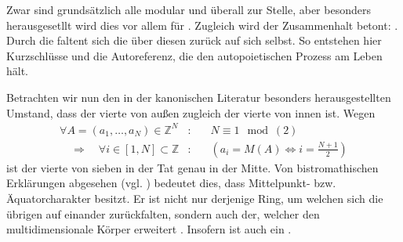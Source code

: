 \begin{newstuff}
    Zwar sind grundsätzlich alle  modular und überall zur Stelle, aber besonders herausgesetllt wird dies vor allem für . Zugleich wird der Zusammenhalt betont: .
    Durch die  faltent sich die  über diesen  zurück auf sich selbst. So entstehen hier Kurzschlüsse und die Autoreferenz, die den autopoietischen Prozess am Leben hält. 

    Betrachten wir nun den in der kanonischen Literatur besonders herausgestellten Umstand, dass der vierte  von außen zugleich der vierte von innen ist. Wegen
        \begin{equation}
        \begin{array}{rcl}
            \forall A = (a_1,\ldots,a_N) \in \mathbb{Z}^N&:&
            \quad
            N\equiv 1\mod(2)\\
            \quad\Rightarrow\quad
            \forall i \in [1,N] \subset \mathbb{Z}&:&
            \quad
            \left(
            a_i = M(A) \Leftrightarrow i = \frac{N+1}{2}
            \right)
        \end{array}
        \end{equation}
    ist der vierte  von sieben in der Tat genau in der Mitte.
    Von bistromathischen  Erklärungen abgesehen (vgl. \cite[Kap. 4]{adams_life})  bedeutet dies, dass   Mittelpunkt- bzw. Äquatorcharakter besitzt. 
    Er ist nicht nur derjenige Ring, um welchen sich die übrigen  auf einander zurückfalten, sondern auch der, welcher den multidimensionale Körper erweitert . Insofern ist  auch ein .
\end{newstuff}